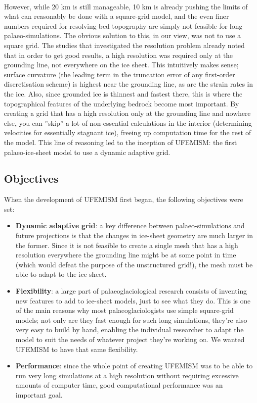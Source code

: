 \documentclass{article}
\begin{document}
\\
However, while 20 km is still manageable, 10 km is already pushing the limits of what can reasonably be done with a square-grid model, and the even finer numbers required for resolving bed topography are simply not feasible for long palaeo-simulations. The obvious solution to this, in our view, was not to use a square grid. The studies that investigated the resolution problem already noted that in order to get good results, a high resolution was required only at the grounding line, not everywhere on the ice sheet. This intuitively makes sense; surface curvature (the leading term in the truncation error of any first-order discretisation scheme) is highest near the grounding line, as are the strain rates in the ice. Also, since grounded ice is thinnest and fastest there, this is where the topographical features of the underlying bedrock become most important. By creating a grid that has a high resolution only at the grounding line and nowhere else, you can ''skip'' a lot of non-essential calculations in the interior (determining velocities for essentially stagnant ice), freeing up computation time for the rest of the model. This line of reasoning led to the inception of UFEMISM: the first palaeo-ice-sheet model to use a dynamic adaptive grid.

\subsection{Objectives}

When the development of UFEMISM first began, the following objectives were set:

\begin{itemize}

\item \textbf{Dynamic adaptive grid}: a key difference between palaeo-simulations and future projections is that the changes in ice-sheet geometry are much larger in the former. Since it is not feasible to create a single mesh that has a high resolution everywhere the grounding line might be at some point in time (which would defeat the purpose of the unstructured grid!), the mesh must be able to adapt to the ice sheet.

\item \textbf{Flexibility}: a large part of palaeoglaciological research consists of inventing new features to add to ice-sheet models, just to see what they do. This is one of the main reasons why most palaeoglaciologists use simple square-grid models; not only are they fast enough for such long simulations, they're also very easy to build by hand, enabling the individual researcher to adapt the model to suit the needs of whatever project they're working on. We wanted UFEMISM to have that same flexibility.

\item \textbf{Performance}: since the whole point of creating UFEMISM was to be able to run very long simulations at a high resolution without requiring excessive amounts of computer time, good computational performance was an important goal.

\end{itemize}
\end{document}
